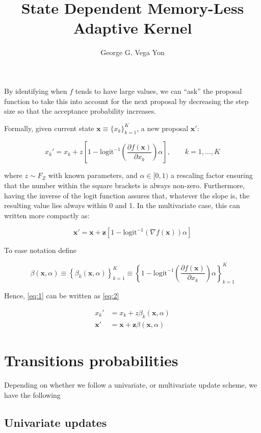 \documentclass{article}
\title{State Dependent Memory-Less Adaptive Kernel}
\author{George G. Vega Yon}
\begin{document}
By identifying when $f$ tends to have large values, we can ``ask'' the proposal function to take this into account for the next proposal by decreasing the step size so that the acceptance probability increases.

Formally, given current state $\mathbf{x} \equiv \{x_k\}_{k=1}^K$, a new proposal $\mathbf{x}'$:


\begin{equation}\label{eq:1}
x_k' = x_k + z\left[1 - \mbox{logit}^{-1}\left(\frac{\partial f(\mathbf{x})}{\partial x_k}\right)\alpha\right],\qquad k=1,\dots, K
\end{equation}

where $z \sim F_Z$ with known parameters, and $\alpha \in [0, 1)$ a rescaling factor ensuring that the number within the square brackets is always non-zero. Furthermore, having the inverse of the logit function assures that, whatever the slope is, the resulting value lies always within 0 and 1. In the multivariate case, this can written more compactly as:

\begin{equation}\label{eq:2}
\mathbf{x}' = \mathbf{x} + \mathbf{z}\left[1 - \mbox{logit}^{-1}\left(\nabla f(\mathbf{x})\right)\alpha\right]
\end{equation}

To ease notation define

$$
\beta(\mathbf{x},\alpha) \equiv \left\{\beta_k\left(\mathbf{x}, \alpha\right)\right\}_{k=1}^K \equiv \left\{1 - \mbox{logit}^{-1}\left(\frac{\partial f(\mathbf{x})}{\partial x_k}\right)\alpha\right\}_{k=1}^K
$$

Hence, \eqref{eq:1} can be written as \eqref{eq:2}

$$
\begin{aligned}
x_k' & = x_k + z\beta_k(\mathbf{x},\alpha) \\
\mathbf{x}' & = \mathbf{x} + \mathbf{z}\beta(\mathbf{x},\alpha)
\end{aligned}
$$

\section{Transitions probabilities}

Depending on whether we follow a univariate, or multivariate update scheme, we have the following

\subsection{Univariate updates}
\end{document}
